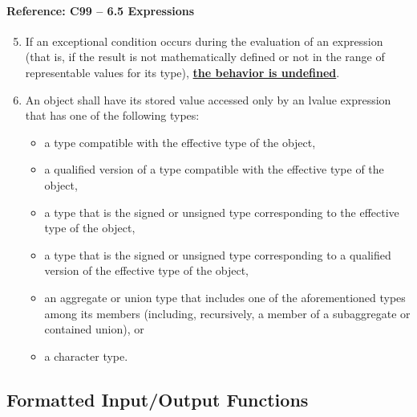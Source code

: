\documentclass[11pt]{article}
\begin{document}
\paragraph{Reference: C99 -- 6.5 Expressions}
\begin{enumerate}
\setcounter{enumi}{4}
\item If an exceptional condition occurs during the evaluation of an expression (that is, 
if the result is not mathematically defined or not in the range of representable values 
for its type), \underline{\bf the behavior is undefined}.
\setcounter{enumi}{6}
\item An object shall have its stored value accessed only by an lvalue expression that 
has one of the following types:
\begin{itemize}
\item a type compatible with the effective type of the object,
\item a qualified version of a type compatible with the effective type of the object,
\item a type that is the signed or unsigned type corresponding to the effective type of the object,
\item a type that is the signed or unsigned type corresponding to a qualified 
version of the effective type of the object,
\item an aggregate or union type that includes one of the aforementioned types among 
its members (including, recursively, a member of a subaggregate or contained union), or
\item a character type.
\end{itemize}
\end{enumerate}

\subsection{Formatted Input/Output Functions}
\label{app:format}
\end{document}
